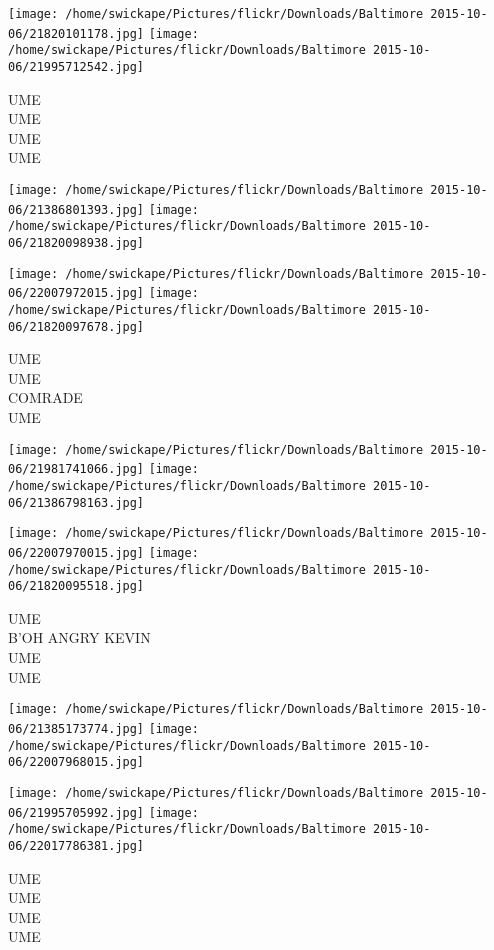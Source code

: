 \documentclass[10pt,letterpaper]{article}
\begin{document}
\texttt{[image: /home/swickape/Pictures/flickr/Downloads/Baltimore 2015-10-06/21820101178.jpg]}
\texttt{[image: /home/swickape/Pictures/flickr/Downloads/Baltimore 2015-10-06/21995712542.jpg]}

UME\\
UME\\
UME\\
UME
\pagebreak

\texttt{[image: /home/swickape/Pictures/flickr/Downloads/Baltimore 2015-10-06/21386801393.jpg]}
\texttt{[image: /home/swickape/Pictures/flickr/Downloads/Baltimore 2015-10-06/21820098938.jpg]}

\texttt{[image: /home/swickape/Pictures/flickr/Downloads/Baltimore 2015-10-06/22007972015.jpg]}
\texttt{[image: /home/swickape/Pictures/flickr/Downloads/Baltimore 2015-10-06/21820097678.jpg]}

UME\\
UME\\
COMRADE\\
UME
\pagebreak

\texttt{[image: /home/swickape/Pictures/flickr/Downloads/Baltimore 2015-10-06/21981741066.jpg]}
\texttt{[image: /home/swickape/Pictures/flickr/Downloads/Baltimore 2015-10-06/21386798163.jpg]}

\texttt{[image: /home/swickape/Pictures/flickr/Downloads/Baltimore 2015-10-06/22007970015.jpg]}
\texttt{[image: /home/swickape/Pictures/flickr/Downloads/Baltimore 2015-10-06/21820095518.jpg]}

UME\\
B'OH ANGRY KEVIN\\
UME\\
UME
\pagebreak

\texttt{[image: /home/swickape/Pictures/flickr/Downloads/Baltimore 2015-10-06/21385173774.jpg]}
\texttt{[image: /home/swickape/Pictures/flickr/Downloads/Baltimore 2015-10-06/22007968015.jpg]}

\texttt{[image: /home/swickape/Pictures/flickr/Downloads/Baltimore 2015-10-06/21995705992.jpg]}
\texttt{[image: /home/swickape/Pictures/flickr/Downloads/Baltimore 2015-10-06/22017786381.jpg]}

UME\\
UME\\
UME\\
UME
\pagebreak
\end{document}
